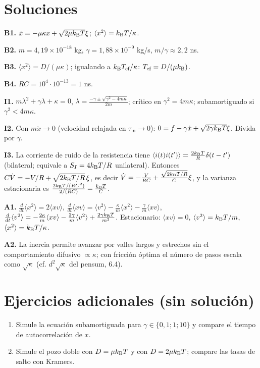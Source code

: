 \documentclass[11pt,a4paper]{article}
\begin{document}
\section{Soluciones}
\begin{solucion}
\textbf{B1.} $\dot x=-\mu\kappa x+\sqrt{2\mu k_{\mathrm B} T}\xi$; $\langle x^2\rangle=k_{\mathrm B} T/\kappa$.

\textbf{B2.} $m=4{,}19\times10^{-18}$ kg, $\gamma=1{,}88\times10^{-9}$ kg/s, $m/\gamma\approx2{,}2$ ns.

\textbf{B3.} $\langle x^2\rangle=D/(\mu\kappa)$; igualando a $k_{\mathrm B} T_{\text{ef}}/\kappa$: $T_{\text{ef}}=D/(\mu k_{\mathrm B})$.

\textbf{B4.} $RC=10^4\cdot10^{-13}=1$ ns.

\textbf{I1.} $m\lambda^2+\gamma\lambda+\kappa=0$, $\lambda=\frac{-\gamma\pm\sqrt{\gamma^2-4m\kappa}}{2m}$; crítico en $\gamma^2=4m\kappa$; subamortiguado si $\gamma^2<4m\kappa$.

\textbf{I2.} Con $m\ddot x\to0$ (velocidad relajada en $\tau_{\text{in}}\to0$): $0=f-\gamma\dot x+\sqrt{2\gamma k_{\mathrm B} T}\xi$. Divida por $\gamma$.

\textbf{I3.} La corriente de ruido de la resistencia tiene $\langle i(t)i(t')\rangle=\frac{2k_{\mathrm B} T}{R}\delta(t-t')$ (bilateral; equivale a $S_I=4k_{\mathrm B} T/R$ unilateral). Entonces $C\dot V=-V/R+\sqrt{2k_{\mathrm B} T/R}\,\xi$, es decir $\dot V=-\frac{V}{RC}+\frac{\sqrt{2k_{\mathrm B} T/R}}{C}\xi$, y la varianza estacionaria es $\frac{2k_{\mathrm B} T/(RC^2)}{2/(RC)}=\frac{k_{\mathrm B} T}{C}$.

\textbf{A1.} $\frac{d}{dt}\langle x^2\rangle=2\langle xv\rangle$, $\frac{d}{dt}\langle xv\rangle=\langle v^2\rangle-\frac\kappa m\langle x^2\rangle-\frac\gamma m\langle xv\rangle$, $\frac d{dt}\langle v^2\rangle=-\frac{2\kappa}m\langle xv\rangle-\frac{2\gamma}m\langle v^2\rangle+\frac{2\gamma k_{\mathrm B} T}{m^2}$. Estacionario: $\langle xv\rangle=0$, $\langle v^2\rangle=k_{\mathrm B} T/m$, $\langle x^2\rangle=k_{\mathrm B} T/\kappa$.

\textbf{A2.} La inercia permite avanzar por valles largos y estrechos sin el comportamiento difusivo $\propto\kappa$; con fricción óptima el número de pasos escala como $\sqrt\kappa$ (cf. $d^2\sqrt\kappa$ del pensum, 6.4).
\end{solucion}

\section{Ejercicios adicionales (sin solución)}
\begin{enumerate}[label=\textbf{P\arabic*.}]
\item Simule la ecuación subamortiguada para $\gamma\in\{0{,}1;1;10\}$ y compare el tiempo de autocorrelación de $x$.
\item Simule el pozo doble con $D=\mu k_{\mathrm B} T$ y con $D=2\mu k_{\mathrm B} T$; compare las tasas de salto con Kramers.
\end{enumerate}
\end{document}
